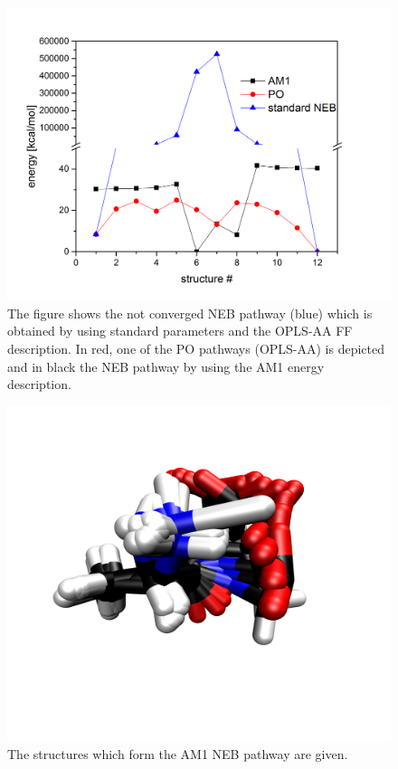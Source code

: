 \documentclass[a4paper,11pt]{scrartcl}
\begin{document}
\begin{figure}[H]
		\center
		\includegraphics[scale=0.4]{Pathopt/PO_NEB_alagly_vergl.png}\caption{The figure shows the not converged NEB pathway (blue) which is obtained by using standard parameters and the OPLS-AA FF description. In red, one of the PO pathways (OPLS-AA) is depicted and in black the NEB pathway by using the AM1 energy description.}
\label{fig:POalaglypaths}
\end{figure}

\begin{figure}[H]
		\center
		\includegraphics[scale=0.1]{Pathopt/ala_gly_am1_pathway.png}\caption{The structures which form the AM1 NEB pathway are given.}
\label{fig:POalaglystrucam}
\end{figure}
\end{document}
